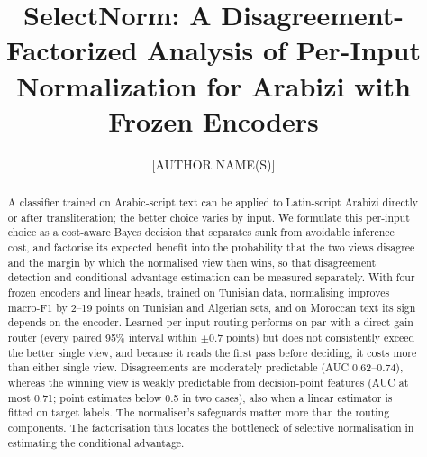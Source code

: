 \documentclass[runningheads]{llncs}
\begin{document}
%
\title{SelectNorm: A Disagreement-Factorized Analysis of Per-Input Normalization for Arabizi with Frozen Encoders}
%
\author{[AUTHOR NAME(S)]\orcidID{[ORCID]}}
\authorrunning{[AUTHOR(S)]}
%
\maketitle
%
\begin{abstract}
A classifier trained on Arabic-script text can be applied to Latin-script Arabizi directly or after transliteration; the better choice varies by input. We formulate this per-input choice as a cost-aware Bayes decision that separates sunk from avoidable inference cost, and factorise its expected benefit into the probability that the two views disagree and the margin by which the normalised view then wins, so that disagreement detection and conditional advantage estimation can be measured separately. With four frozen encoders and linear heads, trained on Tunisian data, normalising improves macro-F1 by 2--19 points on Tunisian and Algerian sets, and on Moroccan text its sign depends on the encoder. Learned per-input routing performs on par with a direct-gain router (every paired 95\% interval within $\pm0.7$ points) but does not consistently exceed the better single view, and because it reads the first pass before deciding, it costs more than either single view. Disagreements are moderately predictable (AUC 0.62--0.74), whereas the winning view is weakly predictable from decision-point features (AUC at most 0.71; point estimates below 0.5 in two cases), also when a linear estimator is fitted on target labels. The normaliser's safeguards matter more than the routing components. The factorisation thus locates the bottleneck of selective normalisation in estimating the conditional advantage.

\end{abstract}
%








%


%
\appendix

\end{document}

